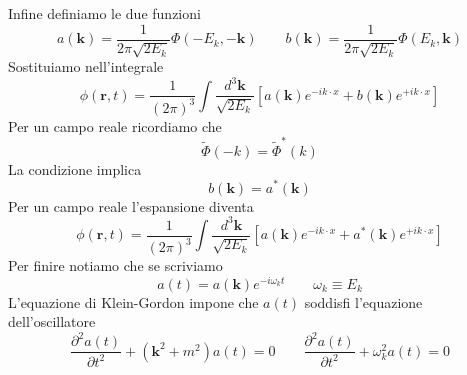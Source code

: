 Infine definiamo le due funzioni
$$
a(\mathbf{k}) = \frac{1}{2\pi\sqrt{2E_k}} \Phi(-E_k, -\mathbf{k}) \qquad b(\mathbf{k}) = \frac{1}{2\pi\sqrt{2E_k}} \Phi(E_k, \mathbf{k})
$$
Sostituiamo nell'integrale
$$
\phi(\mathbf{r}, t) = \frac{1}{(2\pi)^3} \int \frac{d^3\mathbf{k}}{\sqrt{2E_k}} [a(\mathbf{k})e^{-ik\cdot x} + b(\mathbf{k})e^{+ik\cdot x}]
$$
Per un campo reale ricordiamo che
$$
\tilde{\Phi}(-k) = \tilde{\Phi}^*(k)
$$
La condizione implica
$$
b(\mathbf{k}) = a^*(\mathbf{k})
$$
Per un campo reale l'espansione diventa
$$
\phi(\mathbf{r}, t) = \frac{1}{(2\pi)^3} \int \frac{d^3\mathbf{k}}{\sqrt{2E_k}} [a(\mathbf{k})e^{-ik\cdot x} + a^*(\mathbf{k})e^{+ik\cdot x}]
$$
Per finire notiamo che se scriviamo
$$
a(t) = a(\mathbf{k}) e^{-i\omega_k t} \qquad \omega_k \equiv E_k
$$
L'equazione di Klein-Gordon impone che $a(t)$ soddisfi l'equazione dell'oscillatore
$$
\frac{\partial^2 a(t)}{\partial t^2} + (\mathbf{k}^2 + m^2)a(t) = 0 \qquad\frac{\partial^2 a(t)}{\partial t^2} + \omega_k^2 a(t) = 0
$$
